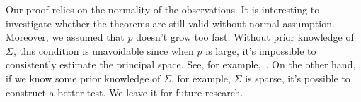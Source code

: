 \documentclass[12pt]{article} %
\theoremstyle{definition}
\begin{document}
Our proof relies on the normality of the observations.
It is interesting to investigate whether the theorems are still valid without normal assumption.
Moreover, we assumed that $p$ doesn't grow too fast.
 Without prior knowledge of $\Sigma$, this condition is unavoidable since when $p$ is large, it's impossible to consistently estimate the principal space.
See, for example,~\cite{Cai2012Sparse}.
On the other hand, if we know some prior knowledge of $\Sigma$, for example, $\Sigma$ is sparse, it's possible to construct a better test.
We leave it for future research.


\end{document}
